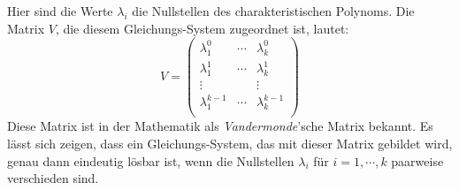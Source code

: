 Hier sind die Werte $\lambda_i$  die Nullstellen des charakteristischen Polynoms.  
Die Matrix $V$, die diesem Gleichungs-System
zugeordnet ist, lautet: 
\[
V = \left(
\begin{array}{lcl}
  \lambda_1^0  & \cdots &   \lambda_k^0 \\[0.2cm]
  \lambda_1^1  & \cdots &   \lambda_k^1 \\[0.2cm]
  \vdots         &         & \vdots \\[0.2cm]
  \lambda_1^{k-1} & \cdots &   \lambda_{k}^{k-1} \\[0.2cm]
\end{array}\right)
\]
Diese Matrix ist in der Mathematik als \emph{Vandermonde}'sche Matrix bekannt.  
Es lässt sich zeigen, dass ein Gleichungs-System, das mit dieser Matrix gebildet wird,
genau dann eindeutig lösbar ist, wenn die Nullstellen $\lambda_i$ für $i=1,\cdots,k$
paarweise verschieden sind.
\vspace*{0.2cm}

